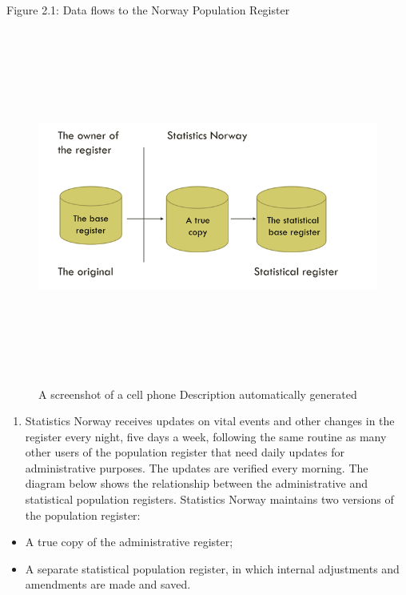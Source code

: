 \documentclass[
]{article}
\providecommand{\tightlist}{%
  \setlength{\itemsep}{0pt}\setlength{\parskip}{0pt}}
\begin{document}
Figure 2.1: Data flows to the Norway Population Register

\begin{figure}
\centering
\includegraphics[width=6.84444in,height=4.59722in]{media/image24.png}
\caption{A screenshot of a cell phone Description automatically
generated}
\end{figure}

\begin{enumerate}
\def\labelenumi{\arabic{enumi}.}
\setcounter{enumi}{253}
\tightlist
\item
  Statistics Norway receives updates on vital events and other
  changes in the register every night, five days a week, following the
  same routine as many other users of the population register that
  need daily updates for administrative purposes. The updates are
  verified every morning. The diagram below shows the relationship
  between the administrative and statistical population registers.
  Statistics Norway maintains two versions of the population register:
\end{enumerate}

\begin{itemize}
\item
  A true copy of the administrative register;
\item
  A separate statistical population register, in which internal
  adjustments and amendments are made and saved.
\end{itemize}
\end{document}
